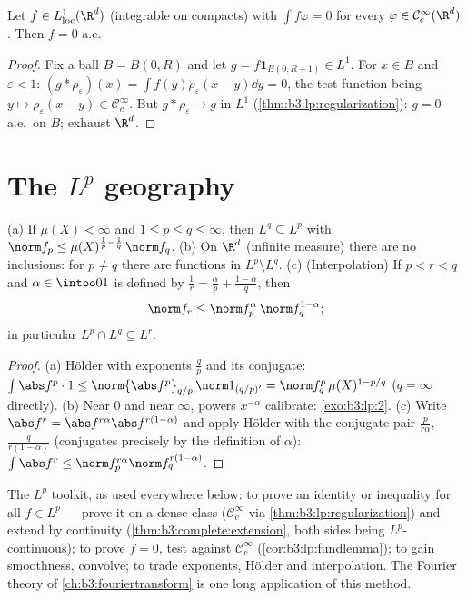 \begin{corollary}\label{cor:b3:lp:fundlemma}
Let $f \in L^1_{\mathrm{loc}}(\R^d)$ (integrable on compacts)
with $\int f\varphi = 0$ for every $\varphi \in \mathcal
C^\infty_c(\R^d)$. Then $f = 0$ a.e.
\end{corollary}

\begin{proof}
Fix a ball $B = B(0, R)$ and let $g = f\mathbf 1_{B(0, R+1)}
\in L^1$. For $x \in B$ and $\varepsilon < 1$: $(g *
\rho_\varepsilon)(x) = \int f(y)\rho_\varepsilon(x - y)\dd y =
0$, the test function being $y \mapsto \rho_\varepsilon(x-y)
\in \mathcal C_c^\infty$. But $g * \rho_\varepsilon \to g$ in
$L^1$ (\cref{thm:b3:lp:regularization}): $g = 0$ a.e.\ on $B$;
exhaust $\R^d$.
\end{proof}

\section{The \texorpdfstring{$L^p$}{Lp} geography}

\begin{proposition}\label{prop:b3:lp:inclusions}
(a) If $\mu(X) < \infty$ and $1 \leq p \leq q \leq \infty$,
then $L^q \subseteq L^p$ with $\norm f_p \leq
\mu(X)^{\frac1p - \frac1q}\,\norm f_q$.
(b) On $\R^d$ (infinite measure) there are no inclusions:
for $p \neq q$ there are functions in $L^p\setminus L^q$.
(c) (Interpolation) If $p < r < q$ and $\alpha \in \intoo01$
is defined by $\frac1r = \frac\alpha p + \frac{1 - \alpha}q$,
then
\[
\norm f_r \leq \norm f_p^{\alpha}\,\norm f_q^{1 - \alpha} ;
\]
in particular $L^p \cap L^q \subseteq L^r$.
\end{proposition}

\begin{proof}
(a) H\"older with exponents $\frac qp$ and its conjugate:
$\int\abs f^p\cdot 1 \leq \norm{\abs f^p}_{q/p}\,\norm
1_{(q/p)'} = \norm f_q^p\,\mu(X)^{1 - p/q}$ ($q = \infty$
directly). (b) Near $0$ and near $\infty$, powers $x^{-\alpha}$
calibrate: \cref{exo:b3:lp:2}. (c) Write $\abs f^r = \abs
f^{r\alpha}\abs f^{r(1-\alpha)}$ and apply H\"older with the
conjugate pair $\frac p{r\alpha}$, $\frac q{r(1-\alpha)}$
(conjugates precisely by the definition of $\alpha$):
$\int\abs f^r \leq \norm f_p^{r\alpha}\norm f_q^{r(1 -
\alpha)}$.
\end{proof}

\begin{method}\label{met:b3:lp:toolkit}
The $L^p$ toolkit, as used everywhere below: to prove an
identity or inequality for all $f \in L^p$ --- prove it on a
dense class ($\mathcal C_c^\infty$ via
\cref{thm:b3:lp:regularization}) and extend by continuity
(\cref{thm:b3:complete:extension}, both sides being
$L^p$-continuous); to prove $f = 0$, test against $\mathcal
C_c^\infty$ (\cref{cor:b3:lp:fundlemma}); to gain smoothness,
convolve; to trade exponents, H\"older and interpolation. The
Fourier theory of \cref{ch:b3:fouriertransform} is one long
application of this method.
\end{method}

